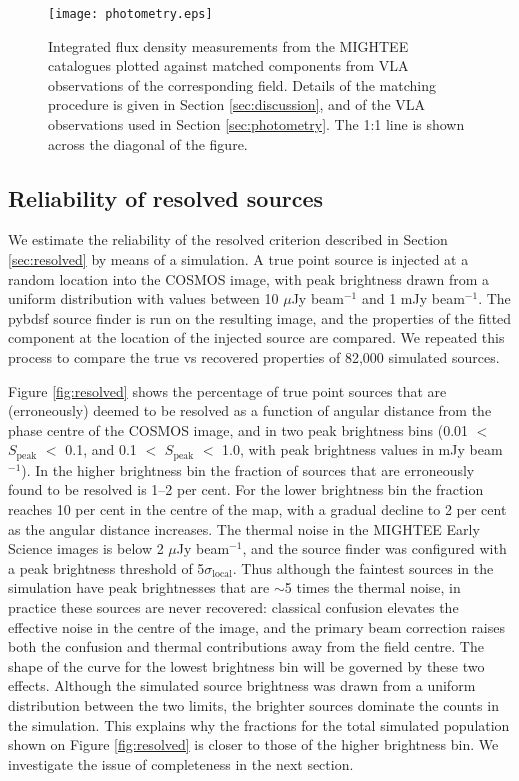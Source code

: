 \documentclass[usenatbib,usedcolumn]{mnras}
\begin{document}
\begin{figure}
 \texttt{[image: photometry.eps]}
 \caption{Integrated flux density measurements from the MIGHTEE catalogues plotted against matched components from VLA observations of the corresponding field. Details of the matching procedure is given in Section \ref{sec:discussion}, and of the VLA observations used in Section \ref{sec:photometry}. The 1:1 line is shown across the diagonal of the figure.}
 \label{fig:cosmos_photometry}
\end{figure}


\subsection{Reliability of resolved sources}
\label{sec:resolved_reliability}

We estimate the reliability of the resolved criterion described in Section \ref{sec:resolved} by means of a simulation. A true point source is injected at a random location into the COSMOS image, with peak brightness drawn from a uniform distribution with values between 10 $\mu$Jy beam$^{-1}$ and 1 mJy beam$^{-1}$. The {\sc pybdsf} source finder is run on the resulting image, and the properties of the fitted component at the location of the injected source are compared. We repeated this process to compare the true vs recovered properties of 82,000 simulated sources.

Figure \ref{fig:resolved} shows the percentage of true point sources that are (erroneously) deemed to be resolved as a function of angular distance from the phase centre of the COSMOS image, and in two peak brightness bins (0.01 $<$ $S_{\mathrm{peak}}$ $<$ 0.1, and 0.1 $<$ $S_{\mathrm{peak}}$ $<$ 1.0, with peak brightness values in mJy beam$^{-1}$). In the higher brightness bin the fraction of sources that are erroneously found to be resolved is 1--2 per cent. For the lower brightness bin the fraction reaches 10 per cent in the centre of the map, with a gradual decline to 2 per cent as the angular distance increases. The thermal noise in the MIGHTEE Early Science images is below 2 $\mu$Jy beam$^{-1}$, and the source finder was configured with a peak brightness threshold of 5$\sigma_{\mathrm{local}}$. Thus although the faintest sources in the simulation have peak brightnesses that are $\sim$5 times the thermal noise, in practice these sources are never recovered: classical confusion elevates the effective noise in the centre of the image, and the primary beam correction raises both the confusion and thermal contributions away from the field centre. The shape of the curve for the lowest brightness bin will be governed by these two effects. Although the simulated source brightness was drawn from a uniform distribution between the two limits, the brighter sources dominate the counts in the simulation. This explains why the fractions for the total simulated population shown on Figure \ref{fig:resolved} is closer to those of the higher brightness bin. We investigate the issue of completeness in the next section.
\end{document}

